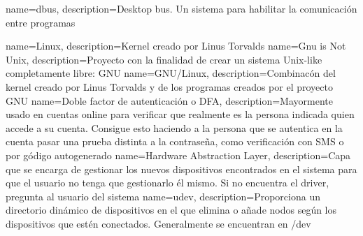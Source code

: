 \makeglossaries


{
	name=dbus,
	description={Desktop bus. Un sistema para habilitar la comunicación entre programas}
}

{
	name=Linux,
	description={Kernel creado por Linus Torvalds}
}
{
	name=Gnu is Not Unix,
	description={Proyecto con la finalidad de crear un sistema Unix-like completamente libre: GNU}
}
{
	name=GNU/Linux,
	description={Combinacón del kernel creado por Linus Torvalds y de los programas creados por el proyecto GNU}
}
{
	name=Doble factor de autenticación o DFA,
	description={Mayormente usado en cuentas online para verificar que realmente es la persona indicada quien accede a su cuenta. Consigue esto haciendo a la persona que se autentica en la cuenta pasar una prueba distinta a la contraseña, como verificación con SMS o por gódigo autogenerado}
}
{
	name=Hardware Abstraction Layer,
	description={Capa que se encarga de gestionar los nuevos dispositivos encontrados en el sistema para que el usuario no tenga que gestionarlo él mismo. Si no encuentra el driver, pregunta al usuario del sistema}
}
{
	name=udev,
	description={Proporciona un directorio dinámico de dispositivos en el que elimina o añade nodos según los dispositivos que estén conectados. Generalmente se encuentran en /dev}
}
